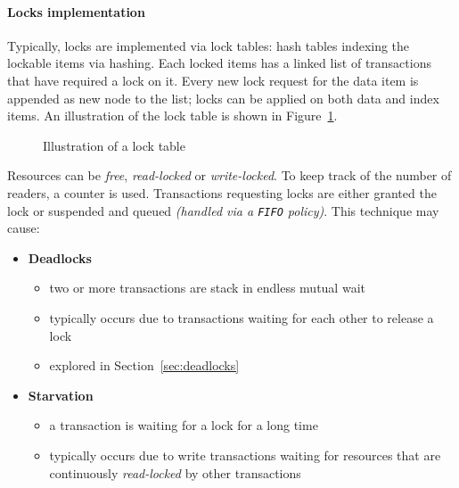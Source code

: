 \documentclass[english]{article}
\begin{document}
\paragraph{Locks implementation}

Typically, locks are implemented via lock tables: hash tables indexing the lockable items via hashing.
Each locked items has a linked list of transactions that have required a lock on it.
Every new lock request for the data item is appended as new node to the list;
locks can be applied on both data and index items.
An illustration of the lock table is shown in Figure~\ref{fig:lock-table}.

\begin{figure}[htbp]
  \centering
  \bigskip
  \caption{Illustration of a lock table}
  \label{fig:lock-table}
  \bigskip
\end{figure}

Resources can be \textit{free}, \textit{read-locked} or \textit{write-locked}.
To keep track of the number of readers, a counter is used.
Transactions requesting locks are either granted the lock or suspended and queued \textit{(handled via a \texttt{FIFO} policy)}.
This technique may cause:

\begin{itemize}
  \item \textbf{Deadlocks}
        \begin{itemize}
          \item two or more transactions are stack in endless mutual wait
          \item typically occurs due to transactions waiting for each other to release a lock
          \item explored in Section~\ref{sec:deadlocks}
        \end{itemize}
  \item \textbf{Starvation}
        \begin{itemize}
          \item a transaction is waiting for a lock for a long time
          \item typically occurs due to write transactions waiting for resources that are continuously \textit{read-locked} by other transactions
        \end{itemize}
\end{itemize}
\end{document}
